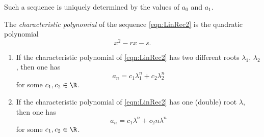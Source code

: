 \begin{page}
\setcounter{section}{1}
\setcounter{subsection}{2}
\setcounter{dfn}{2}
\label{portion:701}

Such a sequence is uniquely determined by the values of $a_0$ and $a_1$.


\end{page}

\begin{page}
\setcounter{section}{1}
\setcounter{subsection}{2}
\setcounter{dfn}{3}
\label{portion:703}

\begin{dfn}
The \emph{characteristic polynomial} of the sequence \eqref{eqn:LinRec2} is the quadratic polynomial
\[
x^2 - rx - s.
\]
\end{dfn}

\end{page}

\begin{page}
\setcounter{section}{1}
\setcounter{subsection}{2}
\setcounter{dfn}{4}
\label{portion:706}

\begin{thm}
\begin{enumerate}
\item
If the characteristic polynomial of \eqref{eqn:LinRec2} has two different roots $\lambda_1$, $\lambda_2$,
then one has
\[
a_n = c_1 \lambda_1^n + c_2 \lambda_2^n
\]
for some $c_1, c_2 \in \R$.
\item
If the characteristic polynomial of \eqref{eqn:LinRec2} has one (double) root $\lambda$,
then one has
\[
a_n = c_1 \lambda^n + c_2 n \lambda^n
\]
for some $c_1, c_2 \in \R$.
\end{enumerate}
\end{thm}

\end{page}

